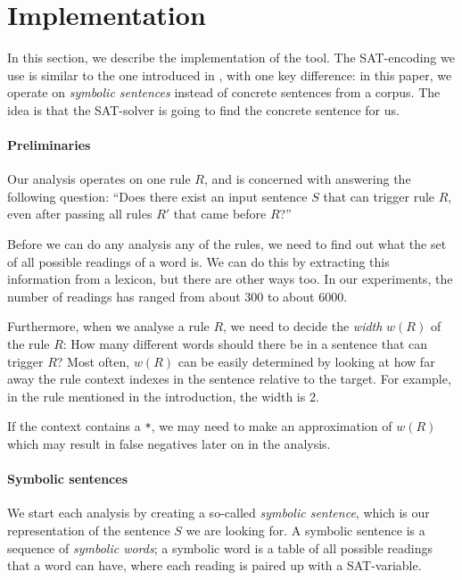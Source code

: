 \section{Implementation}
\label{sec:implementation}

In this section, we describe the implementation of the tool.
The SAT-encoding we use is similar to the one introduced in , with one key difference: in this paper, we operate on {\em symbolic sentences} instead of concrete sentences from a corpus. The idea is that the SAT-solver is going to find the concrete sentence for us.

\paragraph{Preliminaries}

Our analysis operates on one rule $R$, and is concerned with answering the following question: ``Does there exist an input sentence $S$ that can trigger rule $R$, even after passing all rules $R'$ that came before $R$?''

Before we can do any analysis any of the rules, we need to find out what the set of all possible readings of a word is. We can do this by extracting this information from a lexicon, but there are other ways too. In our experiments, the number of readings has ranged from about 300 to about 6000. 

Furthermore, when we analyse a rule $R$, we need to decide the {\em width} $w(R)$ of the rule $R$: How many different words should there be in a sentence that can trigger $R$? Most often, $w(R)$ can be easily determined by looking at how far away the rule context indexes in the sentence relative to the target. For example, in the rule mentioned in the introduction, the width is 2.

If the context contains a \verb!*!,
we may need to make an approximation of $w(R)$ which may result in false negatives later on in the analysis.

\paragraph{Symbolic sentences}

We start each analysis by creating a so-called {\em symbolic sentence}, which is our representation of the sentence $S$ we are looking for. A symbolic sentence is a sequence of {\em symbolic words}; a symbolic word is a table of all possible readings that a word can have, where each reading is paired up with a SAT-variable.


